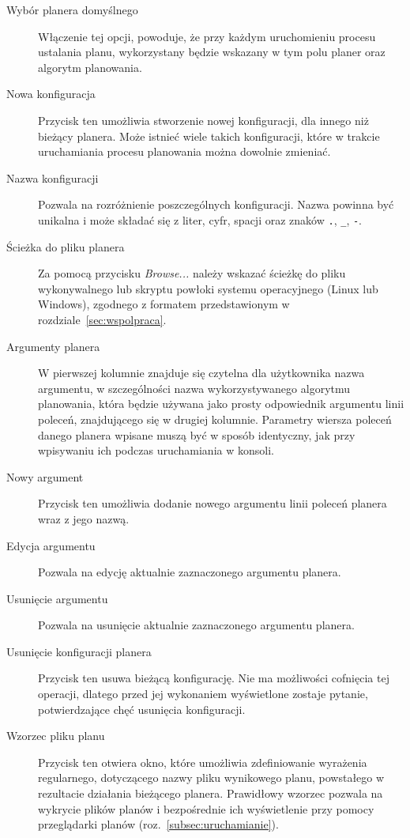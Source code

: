 {
\setcounter{desccount}{1}
\renewcommand{\descriptionlabel}[1]%
{\protect\circled{\arabic{desccount}} \hspace\labelsep\normalfont\bfseries #1\stepcounter{desccount}}

\begin{description}
\item[Wybór planera domyślnego] Włączenie tej opcji, powoduje, że przy każdym uruchomieniu procesu ustalania planu, wykorzystany będzie wskazany w tym polu planer oraz algorytm planowania.
\item [Nowa konfiguracja] Przycisk ten umożliwia stworzenie nowej konfiguracji, dla innego niż bieżący planera. Może istnieć wiele takich konfiguracji, które w trakcie uruchamiania procesu planowania można dowolnie zmieniać.
\item [Nazwa konfiguracji] Pozwala na rozróżnienie poszczególnych konfiguracji. Nazwa powinna być unikalna i może składać się z liter, cyfr, spacji oraz znaków \texttt{.}, \texttt{\_}, \texttt{-}.
\item [Ścieżka do pliku planera] Za pomocą przycisku \emph{Browse...} należy wskazać ścieżkę do pliku wykonywalnego lub skryptu powłoki systemu operacyjnego (Linux lub Windows), zgodnego z formatem przedstawionym w rozdziale~\ref{sec:wspolpraca}.
\item [Argumenty planera] W pierwszej kolumnie znajduje się czytelna dla użytkownika nazwa argumentu, w szczególności nazwa wykorzystywanego algorytmu planowania, która będzie używana jako prosty odpowiednik argumentu linii poleceń, znajdującego się w drugiej kolumnie. Parametry wiersza poleceń danego planera wpisane muszą być w sposób identyczny, jak przy wpisywaniu ich podczas uruchamiania w konsoli.
\item [Nowy argument] Przycisk ten umożliwia dodanie nowego argumentu linii poleceń planera wraz z jego nazwą.
\item [Edycja argumentu] Pozwala na edycję aktualnie zaznaczonego argumentu planera.
\item [Usunięcie argumentu] Pozwala na usunięcie aktualnie zaznaczonego argumentu planera.
\item [Usunięcie konfiguracji planera] Przycisk ten usuwa bieżącą konfigurację. Nie ma możliwości cofnięcia tej operacji, dlatego przed jej wykonaniem wyświetlone zostaje pytanie, potwierdzające chęć usunięcia konfiguracji.
\item [Wzorzec pliku planu] Przycisk ten otwiera okno, które umożliwia zdefiniowanie wyrażenia regularnego, dotyczącego nazwy pliku wynikowego planu, powstałego w rezultacie działania bieżącego planera. Prawidłowy wzorzec pozwala na wykrycie plików planów i bezpośrednie ich wyświetlenie przy pomocy przeglądarki planów (roz.~\ref{subsec:uruchamianie}).
\end{description}
}

